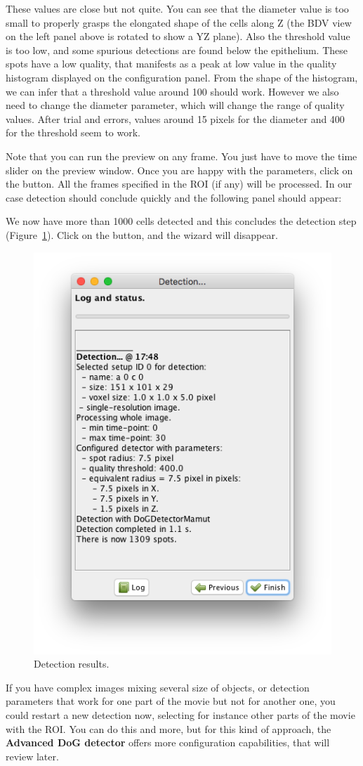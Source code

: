 These values are close but not quite.
You can see that the diameter value is too small to properly grasps the elongated shape of the cells along Z (the BDV view on the left panel above is rotated to show a YZ plane). 
Also the threshold value is too low, and some spurious detections are found below the epithelium.
These spots have a low quality, that manifests as a peak at low value in the quality histogram displayed on the configuration panel.
From the shape of the histogram, we can infer that a threshold value around 100 should work.
However we also need to change the diameter parameter, which will change the range of quality values.
After trial and errors, values around 15 pixels for the diameter and 400 for the threshold seem to work.

Note that you can run the preview on any frame.
You just have to move the time slider on the preview window.
Once you are happy with the parameters, click on the  button.
All the frames specified in the ROI (if any) will be processed. 
In our case detection should conclude quickly and the following panel should appear:

We now have more than 1000 cells detected and this concludes the detection step (Figure~\ref{fig:DetectionResults}).
Click on the  button, and the wizard will disappear.

\begin{figure}
    \centering
    \includegraphics[height=0.40\textwidth, trim=0.5cm 0.5cm .5cm .5cm, clip]{figures/Mastodon_DetectionResuts.png}
    \caption{Detection results.}
    \label{fig:DetectionResults}
\end{figure}

If you have complex images mixing several size of objects, or detection parameters that work for one part of the movie but not for another one, you could restart a new detection now, selecting for instance other parts of the movie with the ROI.
You can do this and more, but for this kind of approach, the \textbf{Advanced DoG detector} offers more configuration capabilities, that will review later.



